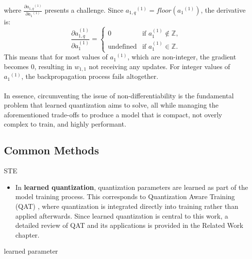   \noindent where \( \frac{\partial {a_{1,q}}^{(1)}}{\partial {a_1}^{(1)}} \) presents a challenge. 
  Since \(  {a_{1,q}}^{(1)} =  floor({a_1}^{(1)}) \), the derivative is: 
            \[
            \frac{\partial a_{1,q}^{(1)}}{\partial a_{1}^{(1)}} =
            \begin{cases} 
                0 & \text{if } a_{1}^{(1)} \notin \mathbb{Z}, \\
                \text{undefined} & \text{if } a_{1}^{(1)} \in \mathbb{Z}.
            \end{cases}
            \]
  This means that for most values of \( {a_1}^{(1)} \), which are non-integer, the gradient becomes $0$, resulting in 
  $w_{1,1}$ not receiving any updates. For integer values of \( {a_1}^{(1)} \), the backpropagation process fails altogether.
\\
\\
In essence, circumventing the issue of non-differentiability is the fundamental problem that learned quantization aims to solve,
all while managing the aforementioned trade-offs to produce a model that is compact, not overly complex to train,
and highly performant.

\subsection{Common Methods}
\label{subsec:subsection2}
STE
\begin{itemize}

  \item In \textbf{learned quantization}, quantization parameters are learned as part of the model training process.
  This corresponds to Quantization Aware Training (QAT) \cite{jacob2018quantization}, where quantization is integrated directly into training rather than applied afterwards.
  Since learned quantization is central to this work, a detailed review of QAT and its applications is provided in the Related Work chapter. 

\end{itemize}

learned parameter



